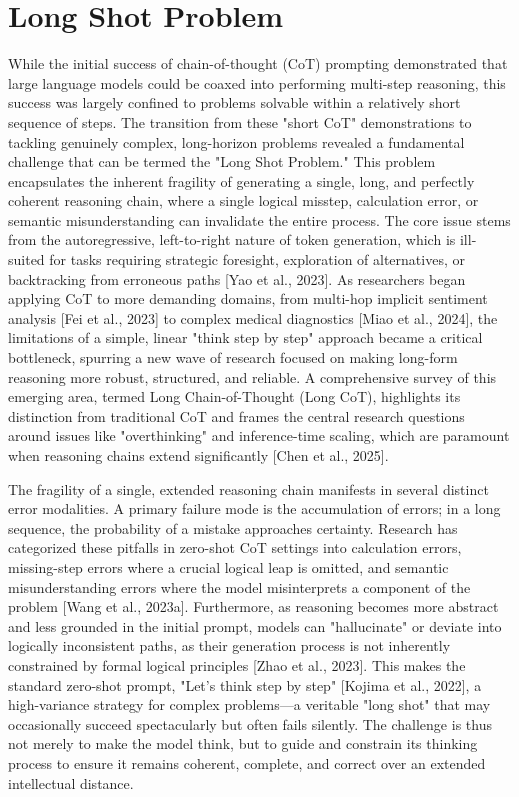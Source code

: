 \documentclass[11pt]{article}
\begin{document}
\section{Long Shot Problem}
While the initial success of chain-of-thought (CoT) prompting demonstrated that large language models could be coaxed into performing multi-step reasoning, this success was largely confined to problems solvable within a relatively short sequence of steps. The transition from these "short CoT" demonstrations to tackling genuinely complex, long-horizon problems revealed a fundamental challenge that can be termed the "Long Shot Problem." This problem encapsulates the inherent fragility of generating a single, long, and perfectly coherent reasoning chain, where a single logical misstep, calculation error, or semantic misunderstanding can invalidate the entire process. The core issue stems from the autoregressive, left-to-right nature of token generation, which is ill-suited for tasks requiring strategic foresight, exploration of alternatives, or backtracking from erroneous paths [Yao et al., 2023]. As researchers began applying CoT to more demanding domains, from multi-hop implicit sentiment analysis [Fei et al., 2023] to complex medical diagnostics [Miao et al., 2024], the limitations of a simple, linear "think step by step" approach became a critical bottleneck, spurring a new wave of research focused on making long-form reasoning more robust, structured, and reliable. A comprehensive survey of this emerging area, termed Long Chain-of-Thought (Long CoT), highlights its distinction from traditional CoT and frames the central research questions around issues like "overthinking" and inference-time scaling, which are paramount when reasoning chains extend significantly [Chen et al., 2025].

The fragility of a single, extended reasoning chain manifests in several distinct error modalities. A primary failure mode is the accumulation of errors; in a long sequence, the probability of a mistake approaches certainty. Research has categorized these pitfalls in zero-shot CoT settings into calculation errors, missing-step errors where a crucial logical leap is omitted, and semantic misunderstanding errors where the model misinterprets a component of the problem [Wang et al., 2023a]. Furthermore, as reasoning becomes more abstract and less grounded in the initial prompt, models can "hallucinate" or deviate into logically inconsistent paths, as their generation process is not inherently constrained by formal logical principles [Zhao et al., 2023]. This makes the standard zero-shot prompt, "Let's think step by step" [Kojima et al., 2022], a high-variance strategy for complex problems—a veritable "long shot" that may occasionally succeed spectacularly but often fails silently. The challenge is thus not merely to make the model think, but to guide and constrain its thinking process to ensure it remains coherent, complete, and correct over an extended intellectual distance.
\end{document}
